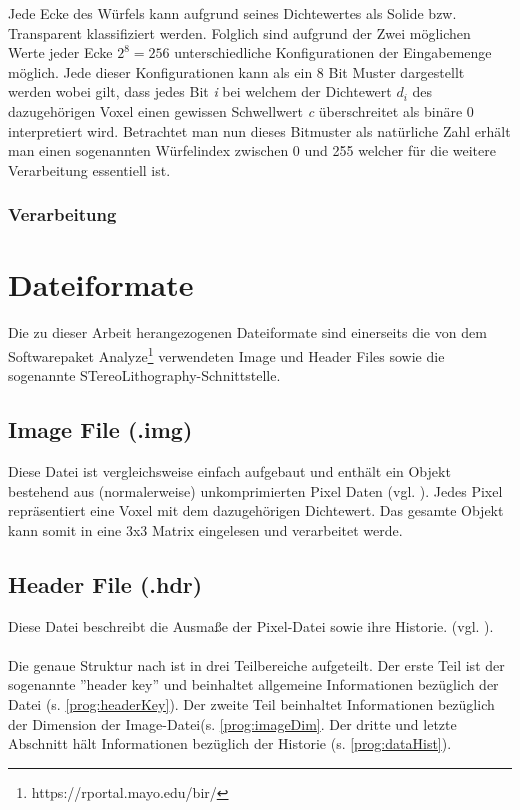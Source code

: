 Jede Ecke des Würfels kann aufgrund seines Dichtewertes als Solide bzw. Transparent klassifiziert werden. Folglich sind aufgrund der Zwei möglichen Werte jeder Ecke $2^{8} = 256$ unterschiedliche Konfigurationen der Eingabemenge möglich. Jede dieser Konfigurationen kann als ein 8 Bit Muster dargestellt werden wobei gilt, dass jedes Bit \textit{i} bei welchem der Dichtewert \textit{$d_{i}$} des dazugehörigen Voxel einen gewissen Schwellwert \textit{c} überschreitet als binäre 0 interpretiert wird. Betrachtet man nun dieses Bitmuster als natürliche Zahl erhält man einen sogenannten Würfelindex zwischen 0  und 255 welcher für die weitere Verarbeitung essentiell ist.

\subsubsection{Verarbeitung}

\section{Dateiformate}
Die zu dieser Arbeit herangezogenen Dateiformate sind einerseits die von dem Softwarepaket Analyze\footnote{https://rportal.mayo.edu/bir/} verwendeten Image und Header Files sowie die sogenannte STereoLithography-Schnittstelle. 

\subsection{Image File (.img)}
Diese Datei ist vergleichsweise einfach aufgebaut und enthält ein Objekt bestehend aus (normalerweise) unkomprimierten Pixel Daten (vgl. \citep{AnalyzeFormat}). Jedes Pixel repräsentiert eine Voxel mit dem dazugehörigen Dichtewert. Das gesamte Objekt kann somit in eine 3x3 Matrix eingelesen und verarbeitet werde.

\subsection{Header File (.hdr)}
Diese Datei beschreibt die Ausmaße der Pixel-Datei sowie ihre Historie. (vgl. \citep{AnalyzeFormat}). \\\\
Die genaue Struktur nach \citep{AnalyzeFormat} ist in drei Teilbereiche aufgeteilt. Der erste Teil ist der sogenannte ''header key'' und beinhaltet allgemeine Informationen bezüglich der Datei (s. \ref{prog:headerKey}). Der zweite Teil beinhaltet Informationen bezüglich der Dimension der Image-Datei(s. \ref{prog:imageDim}. Der dritte und letzte Abschnitt hält Informationen bezüglich der Historie (s. \ref{prog:dataHist}).

